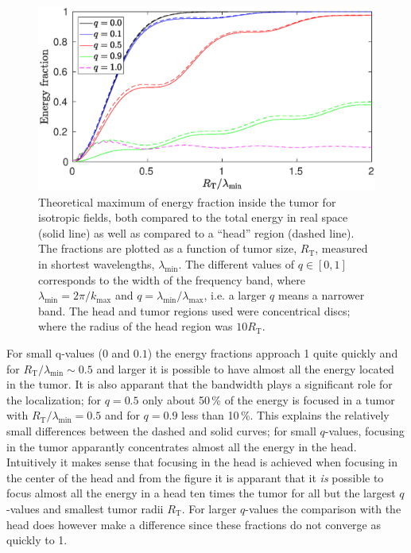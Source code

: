 \documentclass[11pt,a4paper, 
swedish,english %
]{article}
\newcommand{\RT}{\ensuremath{R_{\text{T}}}}
\begin{document}
\begin{figure}
\begin{center}
\centerline{ %
\includegraphics[width=15cm]{ring_both_L1000.eps}
}
\caption{Theoretical maximum of energy fraction inside the tumor for
  isotropic fields, both compared to the total energy in real space
  (solid line) as well as compared to a ``head'' region (dashed
  line). The fractions are plotted as a function of tumor size, $\RT$,
  measured in shortest wavelengths, $\lambda_{\min}$. The different
  values of $q\in[0, 1]$ corresponds to the width of the frequency
  band, where $\lambda_{\min}=2\pi/k_{\max}$ and
  $q=\lambda_{\min}/\lambda_{\max}$, i.e. a larger $q$ means a
  narrower band. The head and tumor regions used were concentrical
  discs; where the radius of the head region was $10\RT$. } 
\label{fig:both}
\end{center}
\end{figure}

For small q-values ($0$ and $0.1$) the energy fractions approach 1
quite quickly and for $\RT/\lambda_{\min} \sim 0.5$ and larger it is
possible to have almost all the energy located in the tumor. It is
also apparant that the bandwidth plays a significant role for the
localization; for $q=0.5$ only about 50\,\% of the energy is focused
in a tumor with $\RT/\lambda_{\min}=0.5$ and for $q=0.9$ less than
10\,\%. 
This explains the relatively small differences between the dashed and
solid curves; for small $q$-values, focusing in the tumor apparantly
concentrates almost all the energy in the head. Intuitively it makes sense
that focusing in the head is achieved when focusing in the center of
the head and from the figure it is apparant that it \emph{is} possible
to focus almost all the energy in a head ten times the tumor for all
but the largest $q$-values and smallest tumor radii $\RT$. For larger
$q$-values the comparison with the head does however make a difference since
these fractions do not converge as quickly to 1.  
\end{document}
